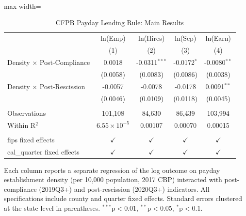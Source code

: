\begin{table}[htbp]
   \caption{\label{tab:main} CFPB Payday Lending Rule: Main Results}
   \bigskip
   \centering
   \begin{adjustbox}{max width=\textwidth}
   \begin{tabular}{lcccc}
      \toprule
                                        & ln(Emp)               & ln(Hires)       & ln(Sep)       & ln(Earn) \\   
                                        & (1)                   & (2)             & (3)           & (4)\\  
      \midrule 
      Density $\times$ Post-Compliance  & 0.0018                & -0.0311$^{***}$ & -0.0172$^{*}$ & -0.0080$^{**}$\\   
                                        & (0.0058)              & (0.0083)        & (0.0086)      & (0.0038)\\   
      Density $\times$ Post-Rescission  & -0.0057               & -0.0078         & -0.0178       & 0.0091$^{**}$\\   
                                        & (0.0046)              & (0.0109)        & (0.0118)      & (0.0045)\\   
       \\
      Observations                      & 101,108               & 84,630          & 86,439        & 103,994\\  
      Within R$^2$                      & $6.55\times 10^{-5}$  & 0.00107         & 0.00070       & 0.00015\\  
       \\
      fips fixed effects                & $\checkmark$          & $\checkmark$    & $\checkmark$  & $\checkmark$\\   
      cal\_quarter fixed effects        & $\checkmark$          & $\checkmark$    & $\checkmark$  & $\checkmark$\\   
      \bottomrule
   \end{tabular}
   \end{adjustbox}

   \par \raggedright
   Each column reports a separate regression of the log outcome on payday establishment density (per 10,000 population, 2017 CBP) interacted with post-compliance (2019Q3+) and post-rescission (2020Q3+) indicators. All specifications include county and quarter fixed effects. Standard errors clustered at the state level in parentheses. $^{***}$p$<$0.01, $^{**}$p$<$0.05, $^{*}$p$<$0.1.
\end{table}
